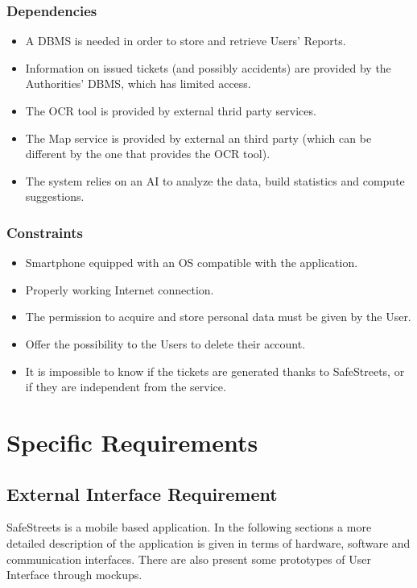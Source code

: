 \documentclass{report}
\begin{document}
\subsection{Dependencies}
\begin{itemize}
	\item A DBMS is needed in order to store and retrieve Users’ Reports.
	\item Information on issued tickets (and possibly accidents) are provided by the Authorities' DBMS, which has limited access. 
	\item The OCR tool is provided by external thrid party services.
	\item The Map service is provided by external an third party (which can be different by the one that provides the OCR tool).
	\item The system relies on an AI to analyze the data, build statistics and compute suggestions.
\end{itemize}
\subsection{Constraints} \label{constraints}
\begin{itemize}
	\item Smartphone equipped with an OS compatible with the application.
	\item Properly working Internet connection.
	\item The permission to acquire and store personal data must be given by the User. 
	\item Offer the possibility to the Users to delete their account.
	\item It is impossible to know if the tickets are generated thanks to SafeStreets, or if they are independent from the service.
	
\end{itemize}

\chapter{Specific Requirements}
\section{External Interface Requirement}
SafeStreets is a mobile based application. In the following sections a more detailed description of the application is given in terms of hardware, software and communication interfaces. There are also present some prototypes of User Interface through mockups.
\end{document}
